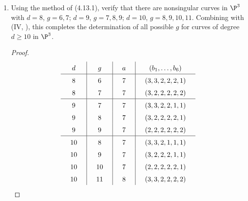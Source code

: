 \documentclass[a4paper]{article}
\begin{document}
\begin{enumerate} [label=\textbf{\arabic*.}, leftmargin=0em]
      \item[\textbf{14.}] Using the method of (4.13.1), verify that there are nonsingular curves in $\P^3$ with $d = 8$, $g = 6, 7$; $d = 9$, $g = 7, 8, 9$; $d = 10$, $g = 8, 9, 10, 11$.
            Combining with (IV, ), this completes the determination of all possible $g$ for curves of degree $d \geq 10$ in $\P^3$.

            \begin{proof}
                  \[
                        \renewcommand{\arraystretch}{1.5}
                        \setlength{\arraycolsep}{14pt}
                        \begin{array}{c|c|c|c}
                              d  & g  & a & (b_1,\ldots,b_6) \\ \hline
                              8  & 6  & 7 & (3,3,2,2,2,1)    \\
                              8  & 7  & 7 & (3,2,2,2,2,2)    \\ \hline
                              9  & 7  & 7 & (3,3,2,2,1,1)    \\
                              9  & 8  & 7 & (3,2,2,2,2,1)    \\
                              9  & 9  & 7 & (2,2,2,2,2,2)    \\ \hline
                              10 & 8  & 7 & (3,3,2,1,1,1)    \\
                              10 & 9  & 7 & (3,2,2,2,1,1)    \\
                              10 & 10 & 7 & (2,2,2,2,2,1)    \\
                              10 & 11 & 8 & (3,3,2,2,2,2)
                        \end{array}
                  \]
            \end{proof}


\end{enumerate}
\end{document}

